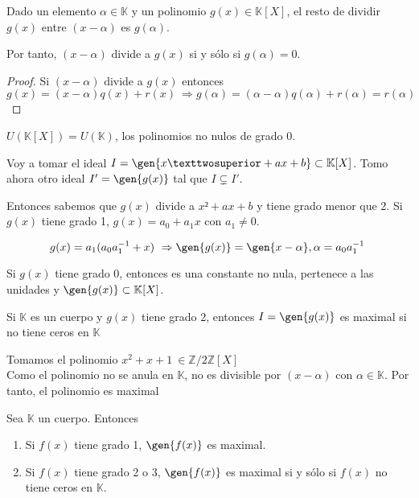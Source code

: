 \documentclass[nochap]{apuntes}
\begin{document}
\begin{theorem}
Dado un elemento $\alpha \in \mathbb{K}$  y un polinomio $g(x)\in \mathbb{K}[X]$, el resto de dividir $g(x)$ entre $(x-\alpha)$ es $g(\alpha)$.

Por tanto, $(x-\alpha)$ divide a $g(x)$ si y sólo si $g(\alpha)=0$.
\end{theorem}

\begin{proof}
 Si $(x-\alpha)$ divide a $g(x)$ entonces \[ g(x)=(x-\alpha)q(x)+r(x) \ \Rightarrow g(\alpha)=(\alpha-\alpha)q(\alpha)+r(\alpha)=r(\alpha) \]
\end{proof}

\obs $U(\mathbb{K}[X])=U(\mathbb{K})$, los polinomios no nulos de grado 0.

\begin{example}
 Voy a tomar el ideal $I=\gen{x²+ax+b}\subset \mathbb{K}[X]$. Tomo ahora otro ideal $I'=\gen{g(x)}$ tal que $I\varsubsetneq I'$.

 Entonces sabemos que $g(x)$ divide a $x²+ax+b$  y tiene grado menor que 2. Si $g(x)$ tiene grado 1, $g(x)=a_0+a_1 x$  con $a_1\neq 0$.

 \[ g(x)= a_1(a_0a_1^{-1}+x) \ \Rightarrow \gen{g(x)}=\gen{x-\alpha},\alpha=a_0a_1^{-1} \]

 Si $g(x)$ tiene grado 0, entonces es una constante no nula, pertenece a las unidades y $\gen{g(x)} \subset \mathbb{K}[X]$.
\end{example}

\begin{lemma}
 Si $\mathbb{K}$  es un cuerpo y $g(x)$ tiene grado 2, entonces $I=\gen{g(x)}$ es maximal si no tiene ceros en $\mathbb{K}$
\end{lemma}

\begin{example}
 Tomamos el polinomio $x^2+x+1 \ \in \mathbb{Z}/2\mathbb{Z}[X]$\\
 Como el polinomio no se anula en $\mathbb{K}$, no es divisible por $(x-\alpha)$ con $\alpha \in \mathbb{K}$. Por tanto, el polinomio es maximal
\end{example}

\begin{theorem}
 Sea $\mathbb{K}$  un cuerpo. Entonces
 \begin{enumerate}
  \item Si $f(x)$ tiene grado 1,  $\gen{f(x)}$ es maximal.
  \item Si $f(x)$ tiene grado 2 o 3, $\gen{f(x)}$ es maximal si y sólo si $f(x)$ no tiene ceros en $\mathbb{K}$.
 \end{enumerate}
\end{theorem}
\end{document}
